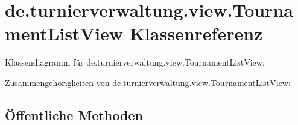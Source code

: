 \hypertarget{classde_1_1turnierverwaltung_1_1view_1_1_tournament_list_view}{}\section{de.\+turnierverwaltung.\+view.\+Tournament\+List\+View Klassenreferenz}
\label{classde_1_1turnierverwaltung_1_1view_1_1_tournament_list_view}


Klassendiagramm für de.\+turnierverwaltung.\+view.\+Tournament\+List\+View\+:


Zusammengehörigkeiten von de.\+turnierverwaltung.\+view.\+Tournament\+List\+View\+:
\subsection*{Öffentliche Methoden}
